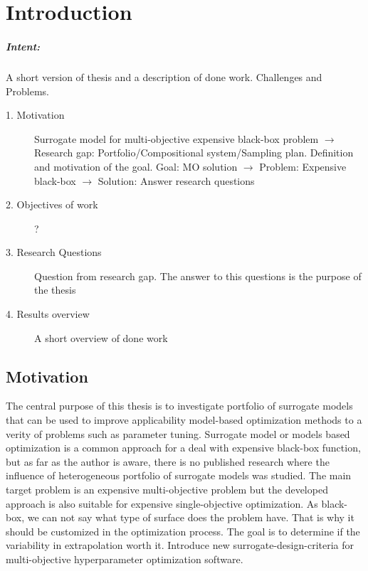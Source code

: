\chapter{Introduction}\label{intro}

\begin{blockquote}
\paragraph{Intent:} A short version of thesis and a description of done work. Challenges and Problems.

    \begin{description}
        \item[1. Motivation] Surrogate model for multi-objective expensive black-box problem $\rightarrow$ Research gap: Portfolio/Compositional system/Sampling plan. Definition and motivation of the goal. Goal: MO solution $\rightarrow$ Problem: Expensive black-box $\rightarrow$ Solution: Answer research questions
        \item[2. Objectives of work] ?
        \item[3. Research Questions] Question from research gap. The answer to this questions is the purpose of the thesis
        \item[4. Results overview] A short overview of done work
    \end{description}
\end{blockquote}

\section{Motivation}

    The central purpose of this thesis is to investigate portfolio of surrogate models that can be used to improve applicability model-based optimization methods to a verity of problems such as parameter tuning. Surrogate model or models based optimization is a common approach for a deal with expensive black-box function, but as far as the author is aware, there is no published research where the influence of heterogeneous portfolio of surrogate models was studied. The main target problem is an expensive multi-objective problem but the developed approach is also suitable for expensive single-objective optimization.
    As black-box, we can not say what type of surface does the problem have. That is why it should be customized in the optimization process. The goal is to determine if the variability in extrapolation worth it. Introduce new surrogate-design-criteria for multi-objective hyperparameter optimization software.

